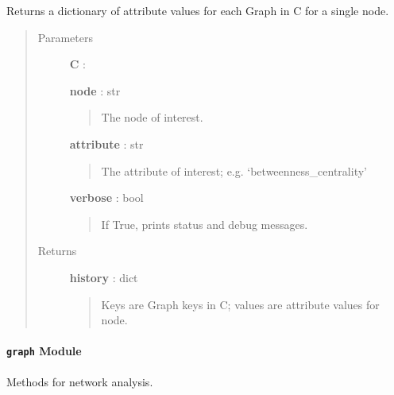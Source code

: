 \documentclass[letterpaper,10pt,english]{sphinxmanual}
\begin{document}

\begin{fulllineitems}
\label{tethne.analyze:tethne.analyze.collection.node_history}
Returns a dictionary of attribute values for each Graph in C for a single
node.
\begin{quote}\begin{description}
\item[{Parameters }] \leavevmode
\textbf{C} : {\hyperref[tethne:tethne.data.GraphCollection]{}}

\textbf{node} : str
\begin{quote}

The node of interest.
\end{quote}

\textbf{attribute} : str
\begin{quote}

The attribute of interest; e.g. `betweenness\_centrality'
\end{quote}

\textbf{verbose} : bool
\begin{quote}

If True, prints status and debug messages.
\end{quote}

\item[{Returns }] \leavevmode
\textbf{history} : dict
\begin{quote}

Keys are Graph keys in C; values are attribute values for node.
\end{quote}

\end{description}\end{quote}

\end{fulllineitems}



\paragraph{\texttt{graph} Module}
\label{tethne.analyze:module-tethne.analyze.graph}\label{tethne.analyze:graph-module}
Methods for network analysis.
\end{document}
